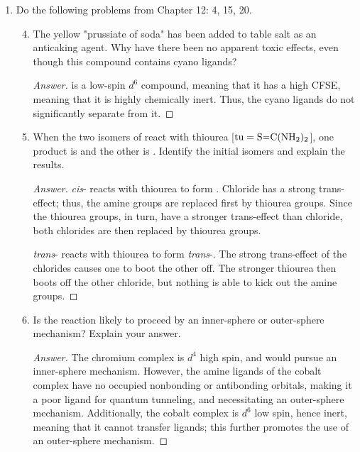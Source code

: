 \documentclass[../psets.tex]{subfiles}
\begin{document}
\begin{enumerate}[label={\Roman*)}]
\begin{enumerate}
\begin{proof}[Answer]
        \end{proof}
    \end{enumerate}
    \newpage
    \item Do the following problems from Chapter 12: 4, 15, 20.
    \begin{enumerate}[label={\textbf{12.\arabic*}}]
        \setcounter{enumii}{3}
        \item The yellow "prussiate of soda"  has been added to table salt as an anticaking agent. Why have there been no apparent toxic effects, even though this compound contains cyano ligands?
        \begin{proof}[Answer]
             is a low-spin $d^6$ compound, meaning that it has a high CFSE, meaning that it is highly chemically inert. Thus, the cyano ligands do not significantly separate from it.
        \end{proof}
        \newpage
        \setcounter{enumii}{14}
        \item When the two isomers of  react with thiourea [$\text{tu}=\ce{S=C(NH2)2}$], one product is  and the other is . Identify the initial isomers and explain the results.
        \begin{proof}[Answer]
            \emph{cis}- reacts with thiourea to form . Chloride has a strong trans-effect; thus, the amine groups are replaced first by thiourea groups. Since the thiourea groups, in turn, have a stronger trans-effect than chloride, both chlorides are then replaced by thiourea groups.\par
            \emph{trans}- reacts with thiourea to form \emph{trans}-. The strong trans-effect of the chlorides causes one to boot the other off. The stronger thiourea then boots off the other chloride, but nothing is able to kick out the amine groups.
        \end{proof}
        \newpage
        \setcounter{enumii}{19}
        \item Is the reaction  likely to proceed by an inner-sphere or outer-sphere mechanism? Explain your answer.
        \begin{proof}[Answer]
            The chromium complex is $d^4$ high spin, and would pursue an inner-sphere mechanism. However, the amine ligands of the cobalt complex have no occupied nonbonding or antibonding orbitals, making it a poor ligand for quantum tunneling, and necessitating an outer-sphere mechanism. Additionally, the cobalt complex is $d^6$ low spin, hence inert, meaning that it cannot transfer ligands; this further promotes the use of an outer-sphere mechanism.
        \end{proof}
    \end{enumerate}
\end{enumerate}
\end{document}
